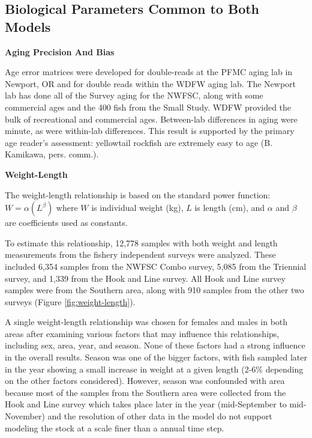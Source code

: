 \documentclass[12pt,]{article}
\begin{document}
\clearpage

\subsection{Biological Parameters Common to Both
Models}\label{biological-parameters-common-to-both-models}

\vspace{.5cm}

\textbf{Aging Precision And Bias}

Age error matrices were developed for double-reads at the PFMC aging lab
in Newport, OR and for double reads within the WDFW aging lab. The
Newport lab has done all of the Survey aging for the NWFSC, along with
some commercial ages and the 400 fish from the Small Study. WDFW
provided the bulk of recreational and commercial ages. Between-lab
differences in aging were minute, as were within-lab differences. This
result is supported by the primary age reader's assessment: yellowtail
rockfish are extremely easy to age (B. Kamikawa, pers. comm.).

\vspace{.5cm}

\textbf{Weight-Length}

The weight-length relationship is based on the standard power function:
\(W = \alpha(L^\beta)\) where \(W\) is individual weight (kg), \(L\) is
length (cm), and \(\alpha\) and \(\beta\) are coefficients used as
constants.

To estimate this relationship, 12,778 samples with both weight and
length measurements from the fishery independent surveys were analyzed.
These included 6,354 samples from the NWFSC Combo survey, 5,085 from the
Triennial survey, and 1,339 from the Hook and Line survey. All Hook and
Line survey samples were from the Southern area, along with 910 samples
from the other two surveys (Figure \ref{fig:weight-length}).

A single weight-length relationship was chosen for females and males in
both areas after examining various factors that may influence this
relationships, including sex, area, year, and season. None of these
factors had a strong influence in the overall results. Season was one of
the bigger factors, with fish sampled later in the year showing a small
increase in weight at a given length (2-6\% depending on the other
factors considered). However, season was confounded with area because
most of the samples from the Southern area were collected from the Hook
and Line survey which takes place later in the year (mid-September to
mid-November) and the resolution of other data in the model do not
support modeling the stock at a scale finer than a annual time step.
\end{document}

